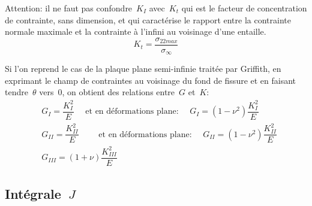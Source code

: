 \medskip
{}
Attention: il ne faut pas confondre~$K_I$ avec~$K_t$ qui est le facteur de concentration
de contrainte, sans dimension, et qui caractérise le rapport entre la contrainte normale
maximale et la contrainte à l'infini au voisinage d'une entaille.
\begin{equation} K_t = \dfrac{\sigma_{22 max}}{\sigma_\infty} \end{equation}

\medskip
Si l'on reprend le cas de la plaque plane semi-infinie traitée par Griffith,
en exprimant le champ de contraintes au voisinage du fond de fissure et en faisant tendre~$\theta$ vers~$0$,
on obtient des relations entre~$G$ et~$K$:
\begin{align}
&G_I = \dfrac{K_I^2}E \quad \text{ et en déformations plane: }\quad
G_I = (1-\nu^2)\dfrac{K_I^2}E \\
&G_{II} = \dfrac{K_{II}^2}E \qquad \text{ et en déformations plane: }\quad
G_{II} = (1-\nu^2)\dfrac{K_{II}^2}E \\
&G_{III} = (1+\nu)\dfrac{K_{III}^2}E
\end{align}

\medskip
\subsection{Intégrale~$J$}

